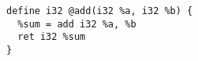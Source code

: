 
\begin{issues}
\issueDraft
\end{issues}



\begin{lstlisting}[language=none]
define i32 @add(i32 %a, i32 %b) {
  %sum = add i32 %a, %b
  ret i32 %sum
}
\end{lstlisting}